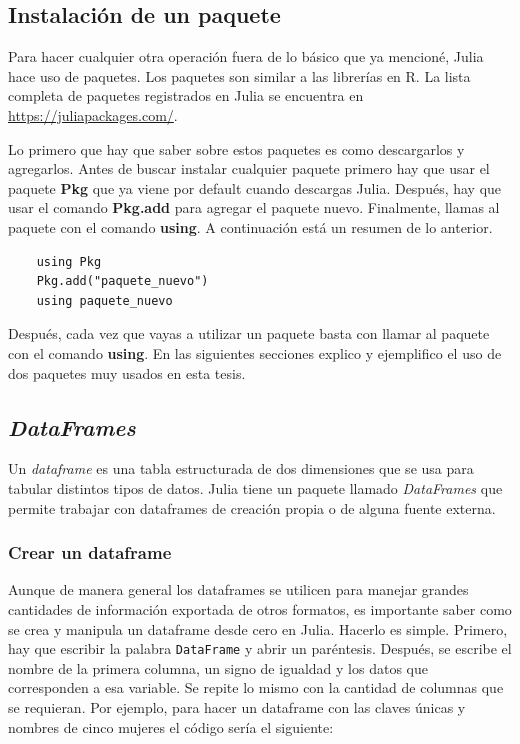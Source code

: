 \subsection{Instalación de un paquete}
Para hacer cualquier otra operación fuera de lo básico que ya mencioné, Julia hace uso de paquetes. Los paquetes son similar a las librerías en R. La lista completa de paquetes registrados en Julia se encuentra en \url{https://juliapackages.com/}. 

Lo primero que hay que saber sobre estos paquetes es como descargarlos y agregarlos. Antes de buscar instalar cualquier paquete primero hay que usar el paquete \textbf{Pkg} que ya viene por default cuando descargas Julia. Después, hay que usar el comando \textbf{Pkg.add} para agregar el paquete nuevo. Finalmente, llamas al paquete con el comando \textbf{using}. A continuación está un resumen de lo anterior. 

\begin{verbatim}
	using Pkg
	Pkg.add("paquete_nuevo")
	using paquete_nuevo
\end{verbatim}

Después, cada vez que vayas a utilizar un paquete basta con llamar al paquete con el comando \textbf{using}. 
En las siguientes secciones explico y ejemplifico el uso de dos paquetes muy usados en esta tesis. 

\subsection{\textit{DataFrames}}

Un \textit{dataframe} es una tabla estructurada de dos dimensiones que se usa para tabular distintos tipos de datos. Julia tiene un paquete llamado \textit{DataFrames}  que permite trabajar con dataframes de creación propia o de alguna fuente externa. 


\subsubsection{Crear un dataframe}

Aunque de manera general los dataframes se utilicen para manejar grandes cantidades de información exportada de otros formatos, es importante saber como se crea y manipula un dataframe desde cero en Julia. Hacerlo es simple. Primero, hay que escribir la palabra \texttt{DataFrame} y abrir un paréntesis. Después, se escribe el nombre de la primera columna, un signo de igualdad y los datos que corresponden a esa variable. Se repite lo mismo con la cantidad de columnas que se requieran. Por ejemplo, para hacer un dataframe con las claves únicas y nombres de cinco mujeres el código sería el siguiente: 


